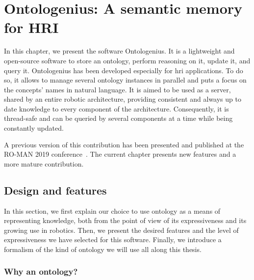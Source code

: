 \ifdefined{}
\else
\setcounter{chapter}{2} %
\dominitoc
\faketableofcontents
\fi

\chapter{Ontologenius: A semantic memory for HRI}
\label{chap:ontologenius}
\minitoc
\label{chap:2}

In this chapter, we present the software Ontologenius. It is a lightweight and open-source software to store an ontology, perform reasoning on it, update it, and query it. Ontologenius has been developed especially for \acrlong{hri} applications. To do so, it allows to manage several ontology instances in parallel and puts a focus on the concepts' names in natural language. It is aimed to be used as a server, shared by an entire robotic architecture, providing consistent and always up to date knowledge to every component of the architecture. Consequently, it is thread-safe and can be queried by several components at a time while being constantly updated.

A previous version of this contribution has been presented and published at the RO-MAN 2019 conference~\cite{sarthou_2019_ontologenius}. The current chapter presents new features and a more mature contribution.

\section{Design and features}

In this section, we first explain our choice to use ontology as a means of representing knowledge, both from the point of view of its expressiveness and its growing use in robotics. Then, we present the desired features and the level of expressiveness we have selected for this software. Finally, we introduce a formalism of the kind of ontology we will use all along this thesis.

\subsection{Why an ontology?}

